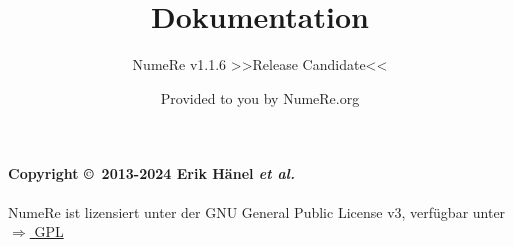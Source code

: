 \documentclass[DIV=17, parskip=half]{scrreprt}
\title{Dokumentation}
\subtitle{NumeRe v1.1.6 >>Release Candidate<<}
\date{}
\author{\small Provided to you by NumeRe.org}
\begin{document}
    \maketitle
% 
% 
	\tableofcontents
		\paragraph{Copyright \copyright\ 2013-2024 Erik H\"anel \emph{et al.}} 
		NumeRe ist lizensiert unter der GNU General Public License v3, verf\"ugbar unter \href{http://www.gnu.org/licenses/gpl.html}{$\Rightarrow$ GPL}
\end{document}
